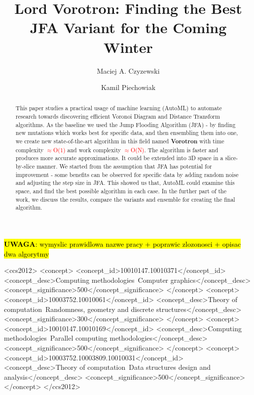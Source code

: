 \documentclass[format=acmsmall,screen,review,authordraft,nonacm]{acmart}
\title{Lord Vorotron: Finding the Best JFA Variant for the Coming Winter} %
\author{Maciej A. Czyzewski}
\affiliation{%
 \department{Institute of Computing Science}
 \institution{Poznan University of Technology}
 \city{Poznan}
 \country{Poland}}
\author{Kamil Piechowiak}
\affiliation{%
 \department{Institute of Computing Science}
 \institution{Poznan University of Technology}
 \city{Poznan}
 \country{Poland}}
\newcommand{\ourjfa}{Vorotron} %
\begin{document}


\hl{\textbf{UWAGA}: wymyslic prawidlowa nazwe pracy + poprawic zlozonosci +
opisac dwa algorytmy}

\begin{abstract}
This paper studies a practical usage of machine learning (AutoML) to automate
research towards discovering efficient Voronoi Diagram and Distance Transform
algorithms.  As the baseline we used the Jump Flooding Algorithm (JFA) - by
finding new mutations which works best for specific data, and then ensembling
them into one, we create new state-of-the-art algorithm in this field named
\textbf{\ourjfa} \hspace{0.01cm} with time complexity \textcolor{red}{$\approx$O(1)} and
work complexity \textcolor{red}{$\approx$O(N)}.
The algorithm is faster and produces more accurate approximations. It could be
extended into 3D space in a slice-by-slice manner.  We started from the
assumption that JFA has potential for improvement - some benefits can be
observed for specific data by adding random noise and adjusting the step size in
JFA.  This showed us that, AutoML could examine this space, and find the best
possible algorithm in each case.  In the further part of the work, we discuss
the results, compare the variants and ensemble for creating the final algorithm.
\end{abstract}


\begin{CCSXML}
<ccs2012>
<concept>
<concept_id>10010147.10010371</concept_id>
<concept_desc>Computing methodologies~Computer graphics</concept_desc>
<concept_significance>500</concept_significance>
</concept>
<concept>
<concept_id>10003752.10010061</concept_id>
<concept_desc>Theory of computation~Randomness, geometry and discrete structures</concept_desc>
<concept_significance>300</concept_significance>
</concept>
<concept>
<concept_id>10010147.10010169</concept_id>
<concept_desc>Computing methodologies~Parallel computing methodologies</concept_desc>
<concept_significance>500</concept_significance>
</concept>
<concept>
<concept_id>10003752.10003809.10010031</concept_id>
<concept_desc>Theory of computation~Data structures design and analysis</concept_desc>
<concept_significance>500</concept_significance>
</concept>
</ccs2012>
\end{CCSXML}
\end{document}
